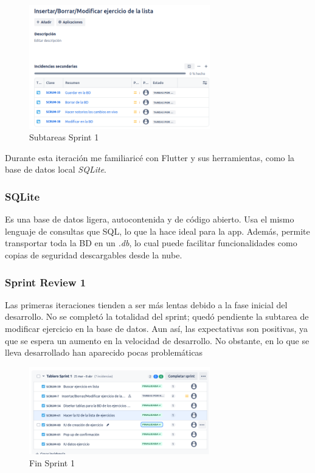 \begin{figure}[h!]
  \centering
  \includegraphics[width=0.7\textwidth]{fotos/SubListPre1.png}
  \caption{Subtareas Sprint 1}
  \label{fig:sublist_pre1}
\end{figure}

Durante esta iteraci\'on me familiaric\'e con Flutter y sus herramientas, como la base de datos local \textit{SQLite}.

\subsubsection*{SQLite}
Es una base de datos ligera, autocontenida y de c\'odigo abierto. Usa el mismo lenguaje de consultas que SQL, lo que la hace ideal para la app. Adem\'as, permite transportar toda la BD en un \textit{.db}, lo cual puede facilitar funcionalidades como copias de seguridad descargables desde la nube.

\subsubsection*{Sprint Review 1}
Las primeras iteraciones tienden a ser m\'as lentas debido a la fase inicial del desarrollo. No se complet\'o la totalidad del sprint; qued\'o pendiente la subtarea de modificar ejercicio en la base de datos. Aun as\'i, las expectativas son positivas, ya que se espera un aumento en la velocidad de desarrollo. No obstante, en lo que se lleva  desarrollado han aparecido pocas problemáticas

\begin{figure}[h!]
  \centering
  \includegraphics[width=0.7\textwidth]{fotos/PostSprint1.png}
  \caption{Fin Sprint 1}
  \label{fig:post_sprint1}
\end{figure}


